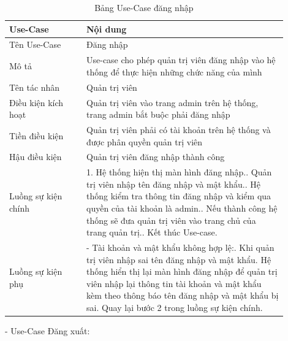\begin{longtable}[htp]{ |m{0.25\linewidth}|m{0.65\linewidth}|}
 \caption{Bảng Use-Case đăng nhập \label{login}}\\
 \hline
 Use-Case & Nội dung \\
 \hline
 Tên Use-Case & Đăng nhập \\
 \hline
 Mô tả & Use-case cho phép quản trị viên đăng nhập vào hệ thống để thực hiện những chức năng của mình\\
 \hline
 Tên tác nhân & Quản trị viên\\
 \hline
 Điều kiện kích hoạt & Quản trị viên vào trang admin trên hệ thống, trang admin bắt buộc phải đăng nhập\\
 \hline
 Tiền điều kiện & Quản trị viên phải có tài khoản trên hệ thống và được phân quyền quản trị viên\\
 \hline
 Hậu điều kiện & Quản trị viên đăng nhập thành công\\
 \hline
 Luồng sự kiện chính & 
  1. Hệ thống hiện thị màn hình đăng nhập.\newline
  2. Quản trị viên nhập tên đăng nhập và mật khẩu.\newline
  3. Hệ thống kiểm tra thông tin đăng nhập và kiểm qua quyền của tài khoản là admin.\newline
  4. Nếu thành công hệ thống sẽ đưa quản trị viên vào trang chủ của trang quản trị.\newline
  5. Kết thúc Use-case.	
 \\
 \hline
 Luồng sự kiện phụ & 
 - Tài khoản và mật khẩu không hợp lệ:\newline
 1. Khi quản trị viên nhập sai tên đăng nhập và mật khẩu\newline
 2. Hệ thống hiển thị lại màn hình đăng nhập để quản trị viên nhập lại thông tin tài khoản và mật khẩu kèm theo thông báo tên đăng nhập và mật khẩu bị sai.\newline
  Quay lại bước 2 trong luồng sự kiện chính.
 \\
 \hline
\end{longtable}
\par
- Use-Case Đăng xuất:

